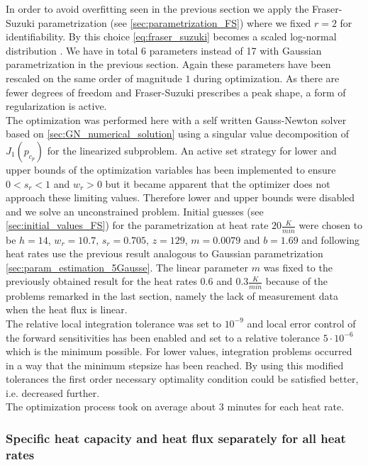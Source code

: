 \documentclass{scrartcl}[12pt, halfparskip]
\numberwithin{equation}{section}
\numberwithin{figure}{section}
\numberwithin{table}{section}
\begin{document}
In order to avoid overfitting seen in the previous section we apply the Fraser-Suzuki parametrization (see \cref{sec:parametrization_FS}) where we fixed $r=2$ for identifiability. By this choice \cref{eq:fraser_suzuki} becomes a scaled log-normal distribution \cite{fraser_suzuki_1}.
We have in total 6 parameters instead of 17 with Gaussian parametrization in the previous section. 
Again these parameters have been rescaled on the same order of magnitude $1$ during optimization.
As there are fewer degrees of freedom and Fraser-Suzuki prescribes a peak shape, a form of regularization is active. \\
The optimization was performed here with a self written Gauss-Newton solver based on \cref{sec:GN_numerical_solution} using a singular value decomposition of $J_1(p_{c_p})$ for the linearized subproblem. 
An active set strategy for lower and upper bounds of the optimization variables has been implemented to ensure $0 < s_r < 1$ and $w_r > 0$ but it became apparent that the optimizer does not approach these limiting values. Therefore lower and upper bounds were disabled and we solve an unconstrained problem. Initial guesses (see \cref{sec:initial_values_FS}) for the parametrization at heat rate $20 \frac{K}{min}$ were chosen to be $h=14$, $w_r=10.7$, $s_r=0.705$, $z=129$, $m=0.0079$ and $b=1.69$ and following heat rates use the previous result analogous to Gaussian parametrization \cref{sec:param_estimation_5Gausse}. The linear parameter $m$ was fixed to the previously obtained result for the heat rates $0.6$ and $0.3 \frac{K}{min}$ because of the problems remarked in the last section, namely the lack of measurement data when the heat flux is linear. \\
The relative local integration tolerance was set to $10^{-9}$ and local error control of the forward sensitivities has been enabled and set to a relative tolerance $5\cdot 10^{-6}$ which is the minimum possible. For lower values, integration problems occurred in a way that the minimum stepsize has been reached. By using this modified tolerances the first order necessary optimality condition could be satisfied better, i.e. decreased further. \\
The optimization process took on average about $3$ minutes for each heat rate.


\subsubsection{Specific heat capacity and heat flux separately for all heat rates}
\end{document}
